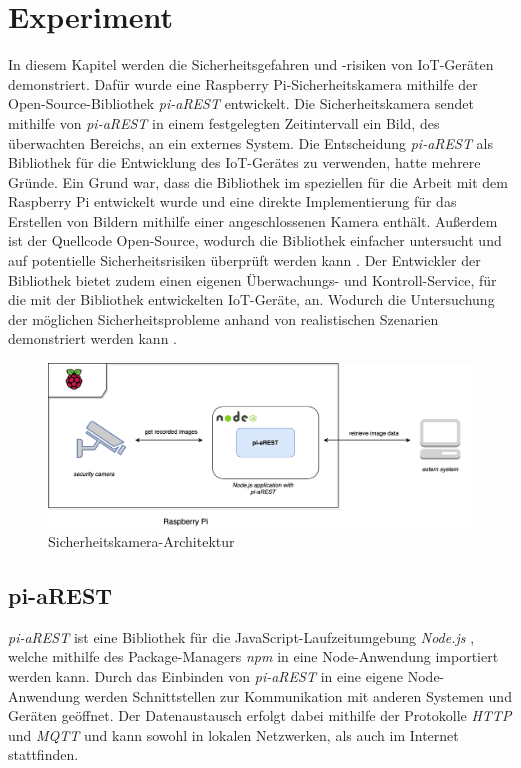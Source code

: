 \section{Experiment}
In diesem Kapitel werden die Sicherheitsgefahren und -risiken von IoT-Geräten demonstriert. 
Dafür wurde eine Raspberry Pi-Sicherheitskamera mithilfe der Open-Source-Bibliothek \textit{pi-aREST} \cite{piarestgtihub, piarestnpm}
entwickelt. Die Sicherheitskamera sendet mithilfe von \textit{pi-aREST} in einem festgelegten 
Zeitintervall ein Bild, des überwachten Bereichs, an ein externes System. Die Entscheidung \textit{pi-aREST} 
als Bibliothek für die Entwicklung des IoT-Gerätes zu verwenden, hatte mehrere Gründe. 
Ein Grund war, dass die Bibliothek im speziellen für die Arbeit mit dem Raspberry Pi entwickelt wurde
und eine direkte Implementierung für das Erstellen von Bildern mithilfe einer angeschlossenen Kamera
enthält. Außerdem ist der Quellcode Open-Source, wodurch die Bibliothek einfacher untersucht
und auf potentielle Sicherheitsrisiken überprüft werden kann \cite{piarestgtihub}. Der Entwickler der Bibliothek
bietet zudem einen eigenen Überwachungs- und Kontroll-Service, für die mit der Bibliothek
entwickelten IoT-Geräte, an. Wodurch die Untersuchung der möglichen Sicherheitsprobleme anhand von 
realistischen Szenarien demonstriert werden kann \cite{arestservice}.  \\

\begin{figure}[h]
  \centering
  \includegraphics[width=125mm]{images/raspberry_architecture.png}
  \caption{Sicherheitskamera-Architektur \cite{piarestgtihub}}
  \label{fig:arch-raspberrypi}
\end{figure}


\subsection{pi-aREST}
\textit{pi-aREST} ist eine Bibliothek für die JavaScript-Laufzeitumgebung \textit{Node.js} \cite{node}, welche mithilfe
des Package-Managers \textit{npm} \cite{piarestnpm} in eine Node-Anwendung importiert werden kann. Durch das Einbinden
von \textit{pi-aREST} in eine eigene Node-Anwendung werden Schnittstellen zur Kommunikation mit anderen
Systemen und Geräten geöffnet. Der Datenaustausch erfolgt dabei mithilfe der Protokolle \textit{HTTP} 
und \textit{MQTT} und kann sowohl in lokalen Netzwerken, als auch im Internet stattfinden. \cite{piarestgtihub}

